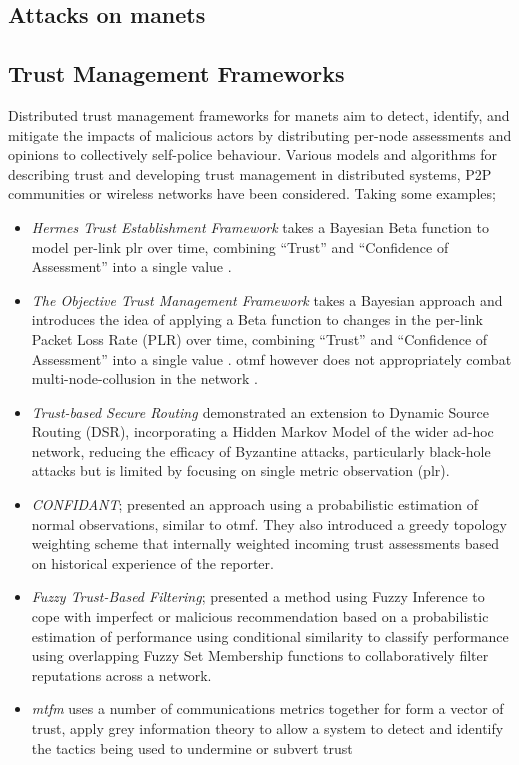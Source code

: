 \subsection{Attacks on \glspl{manet}}



\subsection{Trust Management Frameworks}

Distributed trust management frameworks for \gls{manet}s aim to detect, identify, and mitigate the impacts of malicious actors by distributing per-node assessments and opinions to collectively self-police behaviour.
Various models and algorithms for describing trust and developing trust management in distributed systems, P2P communities or wireless networks have been considered.
Taking some examples;
%
\begin{itemize}
  \item \emph{Hermes Trust Establishment Framework} takes a Bayesian Beta function to model per-link \gls{plr} over time, combining ``Trust'' and ``Confidence of Assessment'' into a single value \cite{Zouridaki2005}.
  \item \emph{The Objective Trust Management Framework} takes a Bayesian approach and introduces the idea of applying a Beta function to changes in the per-link Packet Loss Rate (PLR) over time, combining ``Trust'' and ``Confidence of Assessment'' into a single value \cite{Li2008}.
    \gls{otmf} however does not appropriately combat multi-node-collusion in the network \cite{Cho2011}.
  \item \emph{Trust-based Secure Routing \cite{Moe2008a}} demonstrated an extension to Dynamic Source Routing (DSR), incorporating a Hidden Markov Model of the wider ad-hoc network, reducing the efficacy of Byzantine attacks, particularly black-hole attacks but is limited by focusing on single metric observation (\gls{plr})\cite{Cho2011}.
  \item \emph{CONFIDANT}; \cite{Buchegger2002} presented an approach using a probabilistic estimation of normal observations, similar to \gls{otmf}.
    They also introduced a greedy topology weighting scheme that internally weighted incoming trust assessments based on historical experience of the reporter.
  \item \emph{Fuzzy Trust-Based Filtering}; \cite{Luo2008} presented a method using Fuzzy Inference to cope with imperfect or malicious recommendation based on a probabilistic estimation of performance using conditional similarity to classify performance using overlapping Fuzzy Set Membership functions to collaboratively filter reputations across a network.
  \item \emph{\gls{mtfm}} uses a number of communications metrics together for form a vector of trust, apply grey information theory to allow a system to detect and identify the tactics being used to undermine or subvert trust\cite{Guo11}
\end{itemize}
%

